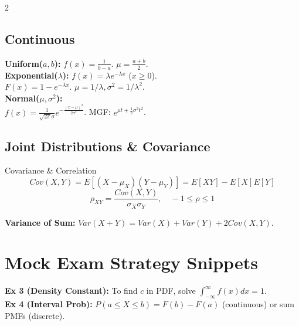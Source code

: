 \documentclass[10pt, letterpaper]{article}
\begin{document}
\begin{multicols*}{2}
\subsection{Continuous}
\textbf{Uniform($a, b$):} $f(x) = \frac{1}{b-a}$. $\mu=\frac{a+b}{2}$.
\\
\textbf{Exponential($\lambda$):} $f(x) = \lambda e^{-\lambda x}$ ($x \ge 0$).
\\ $F(x) = 1 - e^{-\lambda x}$. $\mu=1/\lambda, \sigma^2=1/\lambda^2$.
\\
\textbf{Normal($\mu, \sigma^2$):}
\\ $f(x) = \frac{1}{\sqrt{2\pi}\sigma} e^{-\frac{(x-\mu)^2}{2\sigma^2}}$. MGF: $e^{\mu t + \frac{1}{2}\sigma^2 t^2}$.

\subsection{Joint Distributions \& Covariance}
\begin{defbox}{Covariance \& Correlation}
$$ Cov(X,Y) = E[(X-\mu_X)(Y-\mu_Y)] = E[XY] - E[X]E[Y] $$
$$ \rho_{XY} = \frac{Cov(X,Y)}{\sigma_X \sigma_Y}, \quad -1 \le \rho \le 1 $$
\end{defbox}
\textbf{Variance of Sum:}
$Var(X+Y) = Var(X) + Var(Y) + 2Cov(X,Y)$.

\section{Mock Exam Strategy Snippets}
\textbf{Ex 3 (Density Constant):} To find $c$ in PDF, solve $\int_{-\infty}^{\infty} f(x)dx = 1$.
\\
\textbf{Ex 4 (Interval Prob):} $P(a \le X \le b) = F(b) - F(a)$ (continuous) or sum PMFs (discrete).

\end{multicols*}
\end{document}
